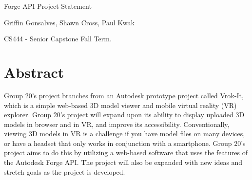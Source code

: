 \documentclass[letterpaper,10pt,draftclsnofoot,onecolumn, titlepage]{IEEEtran}
\begin{document}
\begin{titlepage}
\centering
{\huge Forge API Project Statement\par}
\vfill
{\LARGE Griffin Gonsalves, Shawn Cross, Paul Kwak\par}
{\vspace{2mm}}
{\large CS444 - Senior Capstone Fall Term. \par}
{\vspace{10mm}}
\end{titlepage}

\section{Abstract}
{Group 20’s project branches from an Autodesk prototype project called Vrok-It, which is a simple web-based 3D model viewer and mobile virtual reality (VR) explorer. Group 20’s project will expand upon its ability to display uploaded 3D models in browser and in VR, and improve its accessibility. Conventionally, viewing 3D models in VR is a challenge if you have model files on many devices, or have a headset that only works in conjunction with a smartphone. Group 20’s project aims to do this by utilizing a web-based software that uses the features of the Autodesk Forge API. The project will also be expanded with new ideas and stretch goals as the project is developed. \par}
\end{document}
